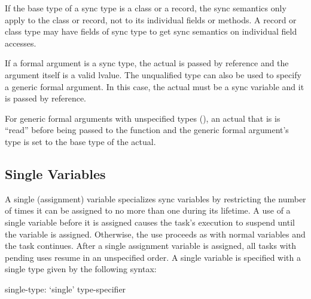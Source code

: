 If the base type of a sync type is a class or a record, the sync
semantics only apply to the class or record, not to its individual
fields or methods.  A record or class type may have fields of sync
type to get sync semantics on individual field accesses.

If a formal argument is a sync type, the actual is passed by reference
and the argument itself is a valid lvalue.  The unqualified
type  can also be used to specify a generic formal
argument.  In this case, the actual must be a sync variable and it is
passed by reference.

For generic formal arguments with unspecified types
(), an actual that
is  is ``read'' before being passed to the function and the
generic formal argument's type is set to the base type of the actual.

\subsection{Single Variables}
\label{Single_Variables}

A single (assignment) variable specializes sync variables by
restricting the number of times it can be assigned to no more than one
during its lifetime.  A use of a single variable before it is assigned
causes the task's execution to suspend until the variable is assigned.
Otherwise, the use proceeds as with normal variables and the task
continues.  After a single assignment variable is assigned, all tasks
with pending uses resume in an unspecified order.  A single variable
is specified with a single type given by the following syntax:
\begin{syntax}
single-type:
  `single' type-specifier
\end{syntax}

